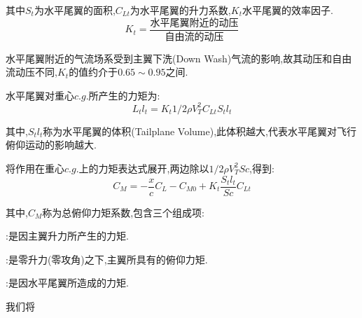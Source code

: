 \documentclass[9pt, oneside]{book}
\begin{document}
其中$S_t$为水平尾翼的面积,$C_{Lt}$为水平尾翼的升力系数,$K_t$水平尾翼的效率因子.
\begin{equation}
    K_t = \frac{\mbox{水平尾翼附近的动压}}{\mbox{自由流的动压}}
\end{equation}

水平尾翼附近的气流场系受到主翼下洗(Down Wash)气流的影响,故其动压和自由流动压不同,$K_t$的值约介于$0.65\sim 0.95$之间.

水平尾翼对重心$c.g.$所产生的力矩为:
\begin{equation}
    L_tl_t = K_t1/2\rho V_T^2C_{Lt}S_tl_t
\end{equation}

其中,$S_tl_t$称为水平尾翼的体积(Tailplane Volume),此体积越大,代表水平尾翼对飞行俯仰运动的影响越大.

将作用在重心$c.g.$上的力矩表达式展开,两边除以$1/2\rho V_T^2Sc$,得到:
\begin{equation}
    C_M = -\frac{x}{c}C_L - C_{M0} + K_t\frac{S_tl_t}{Sc}C_{Lt}
\end{equation}

其中,$C_M$称为总俯仰力矩系数,包含三个组成项:

:是因主翼升力所产生的力矩.

:是零升力(零攻角)之下,主翼所具有的俯仰力矩.

:是因水平尾翼所造成的力矩.

我们将
\end{document}
